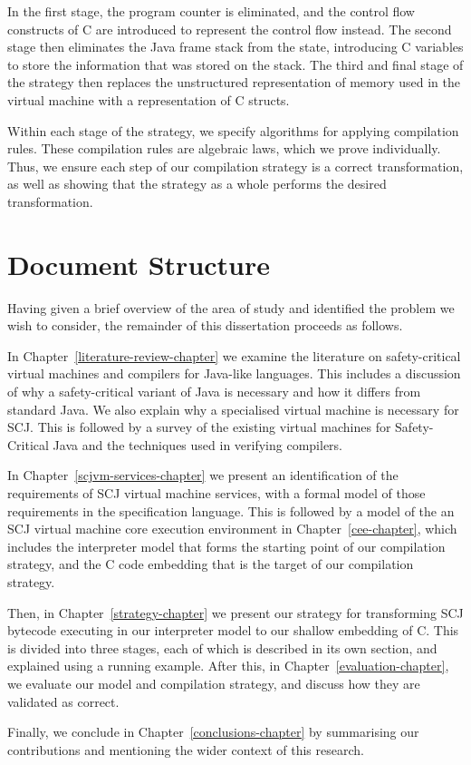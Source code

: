 In the first stage, the program counter is eliminated, and the control
flow constructs of C are introduced to represent the control flow
instead.
The second stage then eliminates the Java frame stack from the state,
introducing C variables to store the information that was stored on
the stack.
The third and final stage of the strategy then replaces the
unstructured representation of memory used in the virtual machine with
a representation of C structs.

Within each stage of the strategy, we specify algorithms for applying
compilation rules.
These compilation rules are algebraic laws, which we prove
individually.
Thus, we ensure each step of our compilation strategy is a correct
transformation, as well as showing that the strategy as a whole
performs the desired transformation.

\section{Document Structure}

Having given a brief overview of the area of study and identified the
problem we wish to consider, the remainder of this dissertation
proceeds as follows.

In Chapter~\ref{literature-review-chapter} we examine the literature
on safety-critical virtual machines and compilers for Java-like
languages.
This includes a discussion of why a safety-critical variant of Java is
necessary and how it differs from standard Java.
We also explain why a specialised virtual machine is necessary for
SCJ.
This is followed by a survey of the existing virtual machines for
Safety-Critical Java and the techniques used in verifying compilers.

In Chapter~\ref{scjvm-services-chapter} we present an identification
of the requirements of SCJ virtual machine services, with a formal
model of those requirements in the \Circus{} specification language.
This is followed by a model of the an SCJ virtual machine core
execution environment in Chapter~\ref{cee-chapter}, which includes the
interpreter model that forms the starting point of our compilation
strategy, and the C code embedding that is the target of our
compilation strategy.

Then, in Chapter~\ref{strategy-chapter} we present our strategy for
transforming SCJ bytecode executing in our interpreter model to our
shallow embedding of C.
This is divided into three stages, each of which is described in its
own section, and explained using a running example.
After this, in Chapter~\ref{evaluation-chapter}, we evaluate our model
and compilation strategy, and discuss how they are validated as
correct.

Finally, we conclude in Chapter~\ref{conclusions-chapter} by
summarising our contributions and mentioning the wider context of this
research.